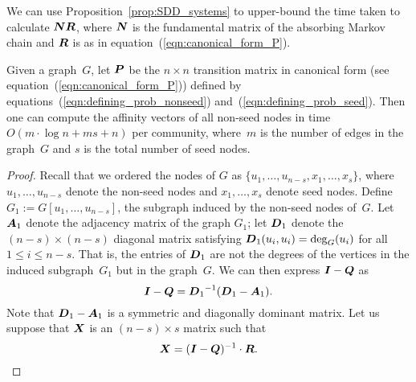 We can use Proposition~\ref{prop:SDD_systems} to upper-bound the time taken to 
calculate $\boldsymbol{N} \boldsymbol{R}$, where $\boldsymbol{N}$ is the fundamental matrix of the absorbing
Markov chain and $\boldsymbol{R}$ is as in equation~(\ref{eqn:canonical_form_P}).
\begin{theorem}\label{theorem:computing_NR}
Given a graph~$G$, let $\boldsymbol{P}$ be the $n \times n$ transition matrix in canonical form 
(see equation~(\ref{eqn:canonical_form_P})) defined by equations~(\ref{eqn:defining_prob_nonseed}) 
and~(\ref{eqn:defining_prob_seed}). Then one can compute 
the affinity vectors of all non-seed nodes in time $O(m \cdot \log n + ms + n)$ per community, 
where~$m$ is the number of edges in the graph~$G$ and $s$ is the total number of seed nodes.
\end{theorem}  
\begin{proof}
Recall that we ordered the nodes of $G$ as $\{u_1, \ldots, u_{n - s}, x_1, \ldots, x_s\}$, 
where $u_1, \ldots, u_{n - s}$ denote the non-seed nodes and $x_1, \ldots, x_s$ denote 
seed nodes. Define $G_1 := G[u_1, \ldots, u_{n - s}]$, the subgraph induced by the non-seed nodes 
of~$G$. Let $\boldsymbol{A}_1$ denote the adjacency matrix of the graph $G_1$; let 
$\boldsymbol{D}_1$ denote the $(n - s) \times (n - s)$ diagonal matrix satisfying 
$\boldsymbol{D}_1(u_i, u_i) = \deg_{G}(u_i)$ for all $1 \leq i \leq n - s$.  That is, the 
entries of $\boldsymbol{D}_1$ are not the degrees of the vertices in the induced subgraph~$G_1$ 
but in the graph~$G$. We can then express 
$\boldsymbol{I} - \boldsymbol{Q}$ as 
\begin{equation} \label{eqn:I-Q}
	\boldsymbol{I}  - \boldsymbol{Q} = {\boldsymbol{D}_1}^{-1} (\boldsymbol{D}_1 - \boldsymbol{A}_1).
\end{equation}
Note that $\boldsymbol{D}_1 - \boldsymbol{A}_1$ is a symmetric and diagonally dominant matrix. 
Let us suppose that $\boldsymbol{X}$ is an $(n - s) \times s$ matrix such that 
\[
	\boldsymbol{X} = (\boldsymbol{I} - \boldsymbol{Q})^{-1} \cdot \boldsymbol{R}.
\]


\end{proof}
